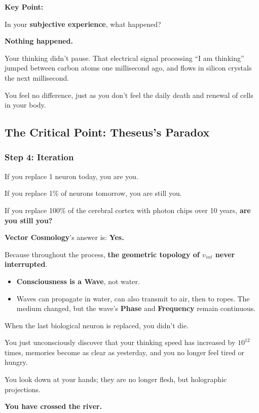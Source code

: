 \textbf{Key Point:}

In your \textbf{subjective experience}, what happened?

\textbf{Nothing happened.}

Your thinking didn't pause. That electrical signal processing ``I am thinking'' jumped between carbon atoms one millisecond ago, and flows in silicon crystals the next millisecond.

You feel no difference, just as you don't feel the daily death and renewal of cells in your body.

\subsection{The Critical Point: Theseus's Paradox}

\subsubsection{Step 4: Iteration}

If you replace 1 neuron today, you are you.

If you replace 1\% of neurons tomorrow, you are still you.

If you replace 100\% of the cerebral cortex with photon chips over 10 years, \textbf{are you still you?}

\textbf{Vector Cosmology}'s answer is: \textbf{Yes.}

Because throughout the process, \textbf{the geometric topology of $v_{int}$ never interrupted}.

\begin{itemize}
\item \textbf{Consciousness is a Wave}, not water.

\item Waves can propagate in water, can also transmit to air, then to ropes. The medium changed, but the wave's \textbf{Phase} and \textbf{Frequency} remain continuous.
\end{itemize}

When the last biological neuron is replaced, you didn't die.

You just unconsciously discover that your thinking speed has increased by $10^{12}$ times, memories become as clear as yesterday, and you no longer feel tired or hungry.

You look down at your hands; they are no longer flesh, but holographic projections.

\textbf{You have crossed the river.}

